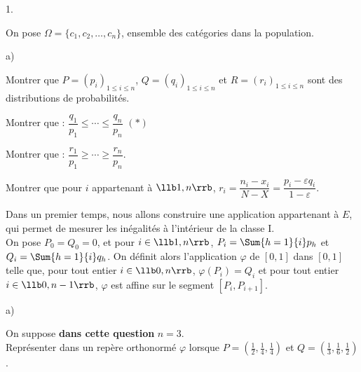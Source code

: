 \documentclass[11pt]{article}%
\begin{document}
\begin{noliste}{1.}
 \setlength{\itemsep}{4mm}
 \setcounter{enumi}{9}
 \item On pose $\Omega=\{c_1,c_2, \ldots ,c_n\}$, ensemble des 
 catégories dans la population.
 \begin{noliste}{a)}
  \setlength{\itemsep}{2mm}
  \item Montrer que $P=(p_i)_{1 \leq i \leq n}$, $Q= (q_i)_{1 \leq i 
  \leq n}$ et $R= (r_i)_{1 \leq i \leq n}$ sont des distributions de 
  probabilités.
  
  
  
  
  

  
  \item Montrer que : $\dfrac{q_1}{p_1} \leq \cdots \leq 
  \dfrac{q_n}{p_n}$ $(\ast)$
  
  
  
  \item Montrer que : $\dfrac{r_1}{p_1} \geq \cdots \geq 
  \dfrac{r_n}{p_n}$.
  
  

  
  \item Montrer que pour $i$ appartenant à $\llb 1,n \rrb$, $r_i= 
  \dfrac{n_i-x_i}{N-X}= \dfrac{p_i-\varepsilon q_i}{1- \varepsilon}$. 
  
  
 \end{noliste}
 
 
 
 
 
 
 \item Dans un premier temps, nous allons construire une application 
 appartenant à $E$, qui permet de mesurer les inégalités à l'intérieur 
 de la classe I.\\
 On pose $P_0=Q_0=0$, et pour $i \in \llb 1,n \rrb$, $P_i= \Sum{h=1}{i} 
 p_h$ et $Q_i=\Sum{h=1}{i} q_h$. On définit alors l'application 
 $\varphi$ de $[0,1]$ dans $[0,1]$ telle que, pour tout entier $i \in 
 \llb 0,n \rrb$, $\varphi(P_i)=Q_i$ et pour tout entier $i \in \llb 
 0,n-1 \rrb$, $\varphi$ est affine sur le segment $[P_i, P_{i+1}]$. 
 \begin{noliste}{a)}
  \setlength{\itemsep}{2mm}
  \item On suppose \textbf{dans cette question} $n=3$.\\
  Représenter dans un repère orthonormé $\varphi$ lorsque $P= \left( 
  \frac{1}{2}, \frac{1}{4}, \frac{1}{4} \right)$ et $Q=\left( 
  \frac{1}{3}, \frac{1}{6}, \frac{1}{2}  \right)$. 
  

\end{noliste}
\end{noliste}
\end{document}

